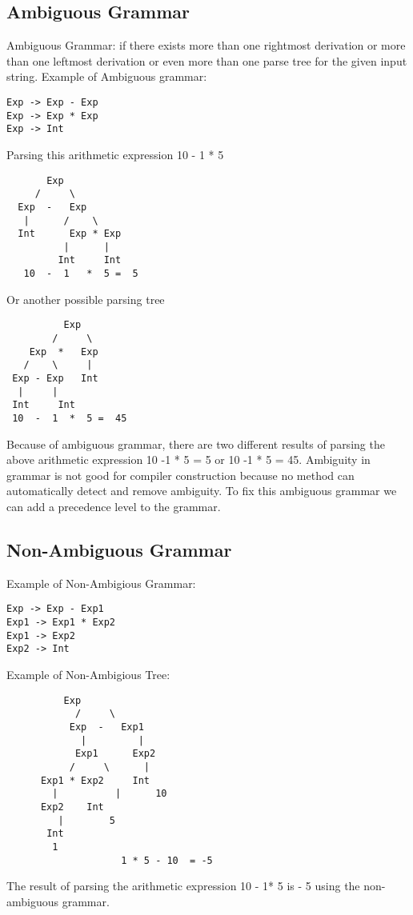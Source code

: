 \documentclass{article}
\begin{document}
\subsection{Ambiguous Grammar}
Ambiguous Grammar: if there exists more than one rightmost derivation or more than one leftmost derivation or even more than one parse tree for the given input string. 
\newline \newline Example of Ambiguous grammar:
\begin{lstlisting}
Exp -> Exp - Exp 
Exp -> Exp * Exp
Exp -> Int
\end{lstlisting}
\indent Parsing this arithmetic expression  10 - 1 * 5 
\begin{lstlisting}
	   Exp
	 /     \
  Exp  -   Exp
   |      /    \  
  Int	   Exp * Exp
          |      | 
         Int	 Int
   10  -  1   *  5 =  5
\end{lstlisting}
Or another possible parsing tree
\begin{lstlisting}
	      Exp
	    /     \
    Exp  *   Exp
   /    \     | 
 Exp - Exp   Int
  |     | 
 Int	 Int
 10  -  1  *  5 =  45
\end{lstlisting}
 Because of ambiguous grammar, there are two different results of parsing the above arithmetic expression 10 -1 * 5 = 5 or 10 -1 * 5 = 45.
 \newline \newline Ambiguity in grammar is not good for compiler construction because no method can automatically detect and remove ambiguity. To fix this ambiguous grammar we can add a precedence level to the grammar.

\subsection{Non-Ambiguous Grammar}
Example of Non-Ambigious Grammar:
\begin{lstlisting}
Exp -> Exp - Exp1 
Exp1 -> Exp1 * Exp2
Exp1 -> Exp2
Exp2 -> Int
\end{lstlisting}
Example of Non-Ambigious Tree:
 \begin{lstlisting}
	   	  Exp
			/     \
		   Exp  -   Exp1
 		     |		   | 
		    Exp1      Exp2
		   /     \      |
      Exp1 * Exp2     Int
		|	       |      10
      Exp2    Int
		 |	      5
       Int
        1
        			1 * 5 - 10  = -5 
\end{lstlisting}
 The result of parsing the arithmetic expression 10 - 1* 5 is - 5 using the non-ambiguous grammar.
\end{document}
